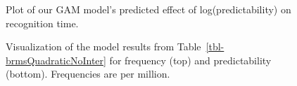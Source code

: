 \documentclass[
  12pt,
  letterpaper,
]{scrreport}
\begin{document}
\begin{figure}[htbp]

\caption{\label{fig-gammodelinterplot}Plot of our GAM model's predicted
effect of log(predictability) on recognition time.}


\end{figure}%

\begin{figure}[htbp]

\caption{\label{fig-FullQuadraticPlot}Visualization of the model results
from Table~\ref{tbl-brmsQuadraticNoInter} for frequency (top) and
predictability (bottom). Frequencies are per million.}


\end{figure}%
\end{document}

